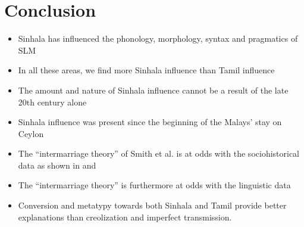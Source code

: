 \documentclass[a4paper,12pt]{article}
\begin{document}
\section{Conclusion}
\begin{itemize}
 \item Sinhala has influenced the phonology, morphology, syntax and pragmatics of SLM
 \item In all these areas, we find more Sinhala influence than Tamil influence
 \item The amount and nature of Sinhala influence cannot be a result of the late 20th century alone
 \item Sinhala influence was present since the beginning of the Malays' stay on Ceylon
 \item The ``intermarriage theory'' of Smith et al. is at odds with the sociohistorical data as shown in \citet{Ansaldo2008genesis} and \citet{Nordhoff2009phd}
 \item The ``intermarriage theory'' is furthermore at odds with the linguistic data 
 \item Conversion and metatypy towards both Sinhala and Tamil provide better explanations than creolization and imperfect transmission.
\end{itemize}







\nocite{Verma1976,Gair1998}
\end{document}
